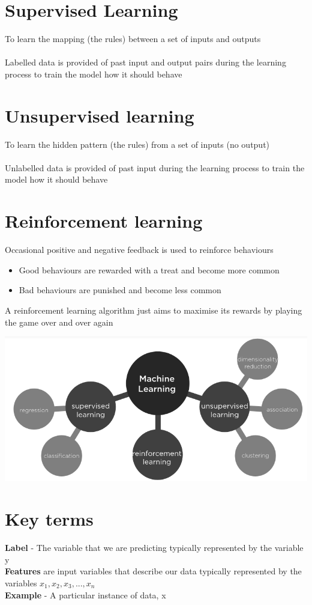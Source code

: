 \documentclass{article}[18pt]
\begin{document}
\section{Supervised Learning}
To learn the mapping (the rules) between a set of inputs and outputs\\
\\
Labelled data is provided of past input and output pairs during the learning process to train the model how it should behave
\section{Unsupervised learning}
To learn the hidden pattern (the rules) from a set of inputs (no output)\\
\\
Unlabelled data is provided of past input during the learning process to train the model how it should behave
\section{Reinforcement learning}
Occasional positive and negative feedback is used to reinforce behaviours
\begin{itemize}
	\item Good behaviours are rewarded with a treat and become more common
	\item Bad behaviours are punished and become less common
\end{itemize}
A reinforcement learning algorithm just aims to maximise its rewards by playing the game over and over again
\begin{center}
	\includegraphics[scale=0.7]{Categories}
\end{center}
\section{Key terms}
\textbf{Label} - The variable that we are predicting typically represented by the variable y\\
\textbf{Features} are input variables that describe our data typically represented by the variables ${x_1,x_2,x_3,...,x_n}$\\
\textbf{Example} - A particular instance of data, x
\end{document}
